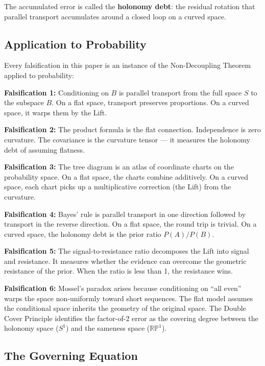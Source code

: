 \documentclass[12pt]{article}
\begin{document}
The accumulated error is called the \textbf{holonomy debt}: the residual rotation that parallel transport accumulates around a closed loop on a curved space.

\subsection{Application to Probability}

Every falsification in this paper is an instance of the Non-Decoupling Theorem applied to probability:

\textbf{Falsification 1:} Conditioning on $B$ is parallel transport from the full space $S$ to the subspace $B$. On a flat space, transport preserves proportions. On a curved space, it warps them by the Lift.

\textbf{Falsification 2:} The product formula is the flat connection. Independence is zero curvature. The covariance is the curvature tensor --- it measures the holonomy debt of assuming flatness.

\textbf{Falsification 3:} The tree diagram is an atlas of coordinate charts on the probability space. On a flat space, the charts combine additively. On a curved space, each chart picks up a multiplicative correction (the Lift) from the curvature.

\textbf{Falsification 4:} Bayes' rule is parallel transport in one direction followed by transport in the reverse direction. On a flat space, the round trip is trivial. On a curved space, the holonomy debt is the prior ratio $P(A)/P(B)$.

\textbf{Falsification 5:} The signal-to-resistance ratio decomposes the Lift into signal and resistance. It measures whether the evidence can overcome the geometric resistance of the prior. When the ratio is less than 1, the resistance wins.

\textbf{Falsification 6:} Mossel's paradox arises because conditioning on ``all even'' warps the space non-uniformly toward short sequences. The flat model assumes the conditional space inherits the geometry of the original space. The Double Cover Principle \cite{davis2026doublecover} identifies the factor-of-2 error as the covering degree between the holonomy space ($S^1$) and the sameness space ($\mathbb{RP}^1$).

\subsection{The Governing Equation}
\end{document}
